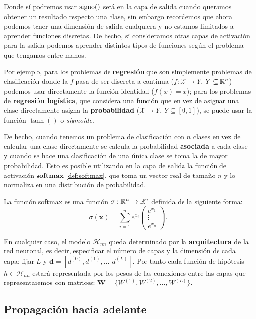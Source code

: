 Donde sí podremos usar $\operatorname{signo}()$ será en la capa de salida cuando queramos obtener un resultado respecto una clase, sin embargo recordemos que ahora podemos tener una dimensión de salida cualquiera y no estamos limitados a aprender funciones discretas. De hecho, si consideramos otras capas de activación para la salida podemos aprender distintos tipos de funciones según el problema que tengamos entre manos.

Por ejemplo, para los problemas de \textbf{regresión} que son simplemente problemas de clasificación donde la $f$ pasa de ser discreta a continua ($f: \mathcal{X} \to Y$, $Y \subseteq \mathbb{R}^n$) podemos usar directamente la función identidad ($f(x) = x$); para los problemas de \textbf{regresión logística}, que considera una función que en vez de asignar una clase directamente asigna la \textbf{probabilidad} ($\mathcal{X} \to Y$, $Y \subseteq [0, 1]$), se puede usar la función $\tanh()$ o \emph{sigmoide}.

De hecho, cuando tenemos un problema de clasificación con $n$ clases en vez de calcular una clase directamente se calcula la probabilidad \textbf{asociada} a cada clase y cuando se hace una clasificación de una única clase se toma la de mayor probabilidad. Esto es posible utilizando en la capa de salida la función de activación \textbf{softmax} \autoref{def:softmax}, que toma un vector real de tamaño $n$ y lo normaliza en una distribución de probabilidad.

\begin{definicion}[Softmax]
  La función softmax es una función $\sigma : \mathbb{R}^n \to \mathbb{R}^n$ definida de la siguiente forma:
  $$\sigma(\textbf{x}) = \sum \limits^n_{i = 1} e^{x_i} \begin{pmatrix} e^{x_1} \\ \vdots \\ e^{x_n}\end{pmatrix}.$$
  \label{def:softmax}
\end{definicion}

En cualquier caso, el modelo $\mathcal{H}_{nn}$ queda determinado por la \textbf{arquitectura} de la red neuronal, es decir, especificar el número de capas y la dimensión de cada capa: fijar $L$ y $\textbf{d} = [d^{(0)}, d^{(1)}, \ldots, d^{(L)}]$. Por tanto cada función de hipótesis $h \in \mathcal{H}_{nn}$ estará representada por los pesos de las conexiones entre las capas que representaremos con matrices: $\textbf{W} = \{W^{(1)}, W^{(2)}, \ldots, W^{(L)}\}$.

\subsection{Propagación hacia adelante}

